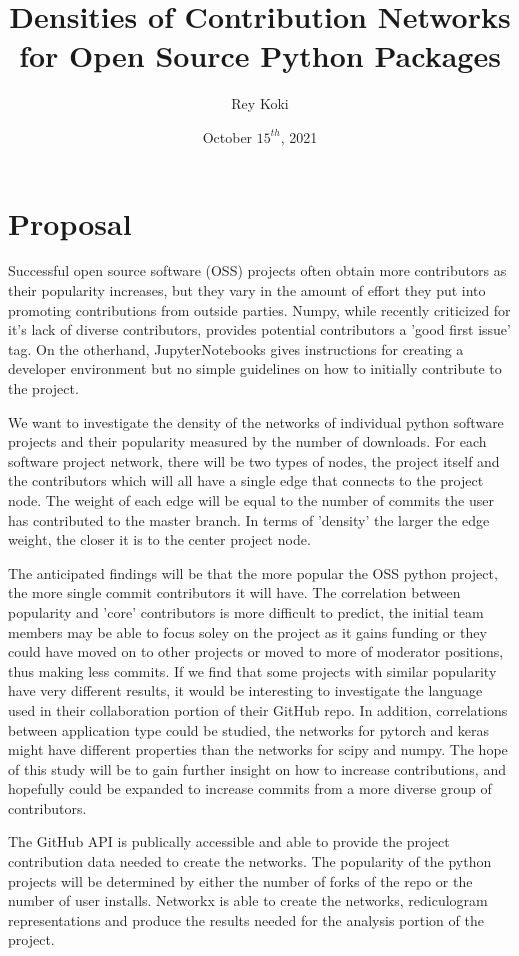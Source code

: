 \documentclass[12pt,a4paper]{article}
\title{Densities of Contribution Networks for Open Source Python Packages}
\author{Rey Koki}
\date{October $15^{th}$, 2021}
\begin{document}
\maketitle

\section*{Proposal}

Successful open source software (OSS) projects often obtain more contributors as their popularity increases, but they vary in the amount of effort they put into promoting contributions from outside parties. Numpy, while recently criticized for it's lack of diverse contributors, provides potential contributors a 'good first issue' tag. On the otherhand, JupyterNotebooks gives instructions for creating a developer environment but no simple guidelines on how to initially contribute to the project. 

\vspace{.25cm}

We want to investigate the density of the networks of individual python software projects and their popularity measured by the number of downloads. For each software project network, there will be two types of nodes, the project itself and the contributors which will all have a single edge that connects to the project node. The weight of each edge will be equal to the number of commits the user has contributed to the master branch. In terms of 'density' the larger the edge weight, the closer it is
to the center project node. 

\vspace{.25cm}

The anticipated findings will be that the more popular the OSS python project, the more single commit contributors it will have. The correlation between popularity and 'core' contributors is more difficult to predict, the initial team members may be able to focus soley on the project as it gains funding or they could have moved on to other projects or moved to more of moderator positions, thus making less commits. If we find that some projects with similar popularity have very
different results, it would be interesting to investigate the language used in their collaboration portion of their GitHub repo. In addition, correlations between application type could be studied, the networks for pytorch and keras might have different properties than the networks for scipy and numpy. The hope of this study will be to gain further insight on how to increase contributions, and hopefully could be expanded to increase commits from a more diverse group of contributors.

\vspace{.25cm}

The GitHub API is publically accessible and able to provide the project contribution data needed to create the networks. The popularity of the python projects will be determined by either the number of forks of the repo or the number of user installs. Networkx is able to create the networks, rediculogram representations and produce the results needed for the analysis portion of the project. 
\end{document}
